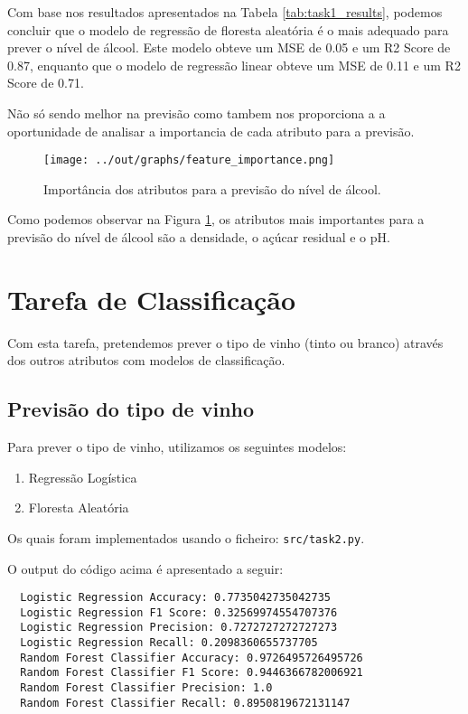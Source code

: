 \documentclass{article}
\begin{document}
Com base nos resultados apresentados na Tabela \ref{tab:task1_results}, podemos concluir que o modelo de regressão de floresta aleatória é o mais adequado para prever o nível de álcool. Este modelo obteve um MSE de 0.05 e um R2 Score de 0.87, enquanto que o modelo de regressão linear obteve um MSE de 0.11 e um R2 Score de 0.71.

Não só sendo melhor na previsão como tambem nos proporciona a a oportunidade de analisar a importancia de cada atributo para a previsão.

\begin{figure}[ht]
  \centering
  \texttt{[image: ../out/graphs/feature\_importance.png]}
  \caption{Importância dos atributos para a previsão do nível de álcool.}
  \label{fig:task1_feature_importance}
\end{figure}

Como podemos observar na Figura \ref{fig:task1_feature_importance}, os atributos mais importantes para a previsão do nível de álcool são a densidade, o açúcar residual e o pH.

\section{Tarefa de Classificação}

Com esta tarefa, pretendemos prever o tipo de vinho (tinto ou branco) através dos outros atributos com modelos de classificação.

\subsection{Previsão do tipo de vinho}

Para prever o tipo de vinho, utilizamos os seguintes modelos:

\begin{enumerate}
  \item Regressão Logística
  \item Floresta Aleatória
\end{enumerate}

Os quais foram implementados usando o ficheiro: \texttt{src/task2.py}.

O output do código acima é apresentado a seguir:

\begin{verbatim}
  Logistic Regression Accuracy: 0.7735042735042735
  Logistic Regression F1 Score: 0.32569974554707376
  Logistic Regression Precision: 0.7272727272727273
  Logistic Regression Recall: 0.2098360655737705
  Random Forest Classifier Accuracy: 0.9726495726495726
  Random Forest Classifier F1 Score: 0.9446366782006921
  Random Forest Classifier Precision: 1.0
  Random Forest Classifier Recall: 0.8950819672131147
\end{verbatim}
\end{document}
